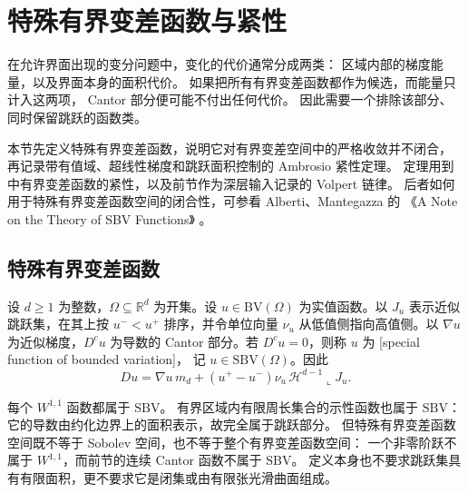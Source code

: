 \section{特殊有界变差函数与紧性}
\label{b1:sec:2804}

在允许界面出现的变分问题中，变化的代价通常分成两类：
区域内部的梯度能量，以及界面本身的面积代价。
如果把所有有界变差函数都作为候选，而能量只计入这两项，
Cantor 部分便可能不付出任何代价。
因此需要一个排除该部分、同时保留跳跃的函数类。

\ProseParagraphBreak

本节先定义特殊有界变差函数，说明它对有界变差空间中的严格收敛并不闭合，
再记录带有值域、超线性梯度和跳跃面积控制的 Ambrosio 紧性定理。
定理用到中有界变差函数的紧性，以及前节作为深层输入记录的 Volpert 链律。
后者如何用于特殊有界变差函数空间的闭合性，可参看 Alberti、Mantegazza 的
《A Note on the Theory of SBV Functions》%
\cite[Theorem 1.4, Propositions 2.3 and 2.5]{AlbertiMantegazza1997SBV}。

\subsection{特殊有界变差函数}
\label{b1:subsec:280401}

\begin{definition}\label{b1:def:sbv-function}
设 \(d\ge1\) 为整数，\(\Omega\subseteq\mathbb R^d\) 为开集。设 \(u\in\mathrm{BV}(\Omega)\) 为实值函数。以 \(J_u\) 表示近似跳跃集，在其上按 \(u^-<u^+\) 排序，并令单位向量 \(\nu_u\) 从低值侧指向高值侧。以 \(\nabla u\) 为近似梯度，\(D^cu\) 为导数的 Cantor 部分。若 \(D^cu=0\)，则称 \(u\) 为%
[special function of bounded variation]，
记 \(u\in \mathrm{SBV}(\Omega)\)。因此
\[
 Du=\nabla u\,m_d+(u^+-u^-)\nu_u\,
 \mathcal H^{d-1}\mathbin{\llcorner}J_u.
\]
\end{definition}

每个 \(W^{1,1}\) 函数都属于 \(\mathrm{SBV}\)。
有界区域内有限周长集合的示性函数也属于 \(\mathrm{SBV}\)：
它的导数由约化边界上的面积表示，故完全属于跳跃部分。
但特殊有界变差函数空间既不等于 Sobolev 空间，也不等于整个有界变差函数空间：
一个非零阶跃不属于 \(W^{1,1}\)，而前节的连续 Cantor 函数不属于 \(\mathrm{SBV}\)。
定义本身也不要求跳跃集具有有限面积，更不要求它是闭集或由有限张光滑曲面组成。

